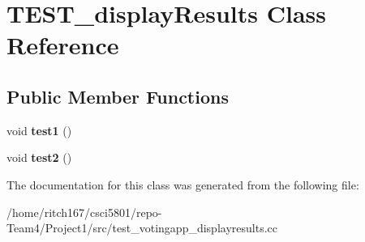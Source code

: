 \hypertarget{classTEST__displayResults}{}\section{T\+E\+S\+T\+\_\+display\+Results Class Reference}
\label{classTEST__displayResults}
\subsection*{Public Member Functions}
\begin{DoxyCompactItemize}
\item 
\mbox{\label{classTEST__displayResults_ab8c2c94ddf497d04f92d0c1c05d9e03d}} 
void {\bfseries test1} ()
\item 
\mbox{\label{classTEST__displayResults_aef6d813520e7c9e1a87cd7d8e9518692}} 
void {\bfseries test2} ()
\end{DoxyCompactItemize}


The documentation for this class was generated from the following file\+:\begin{DoxyCompactItemize}
\item 
/home/ritch167/csci5801/repo-\/\+Team4/\+Project1/src/test\+\_\+votingapp\+\_\+displayresults.\+cc\end{DoxyCompactItemize}
